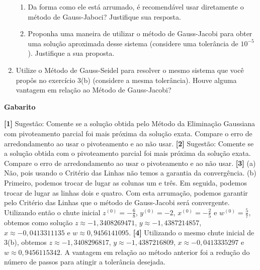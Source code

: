 \documentclass[12pt,a4paper]{article}
\begin{document}
\begin{enumerate}
  \begin{enumerate}
   \item Da forma como ele está arrumado, é recomendável usar diretamente o método de Gauss-Jaboci? Justifique sua resposta.
   \item Proponha uma maneira de utilizar o método de Gauss-Jacobi para obter uma solução aproximada desse sistema (considere uma tolerância de $10^{-5}$). 
         Justifique a sua proposta.
  \end{enumerate}


  \item Utilize o Método de Gauss-Seidel para resolver o mesmo sistema que você propôs no exercício 3(b) (considere a mesma tolerância). Houve alguma vantagem em relação ao 
Método de Gauss-Jacobi?

\end{enumerate}

\begin{center}
\textbf{Gabarito}
\end{center} 
\textbf{[1]} Sugestão: Comente se a solução obtida pelo Método da Eliminação Gaussiana com pivoteamento parcial foi mais próxima da solução exata. 
Compare o erro de arredondamento ao usar o pivoteamento e ao não usar.
\textbf{[2]} Sugestão: Comente se a solução obtida com o pivoteamento parcial foi mais próxima da solução exata. 
Compare o erro de arredondamento ao usar o pivoteamento e ao não usar. 
\textbf{[3]} (a) Não, pois usando o Critério das Linhas não temos a garantia da convergência. 
(b) Primeiro, podemos trocar de lugar as colunas um e três. Em seguida, podemos trocar de lugar as linhas dois e quatro. Com esta arrumação,
podemos garantir pelo Critério das Linhas que o método de Gauss-Jacobi será convergente. Utilizando então o chute inicial $z^{(0)} = -\frac{6}{8}$, 
$y^{(0)} = -2$, $x^{(0)} = -\frac{2}{5}$ e $w^{(0)} = \frac{5}{7}$, obtemos como solução $z \approx -1,3408269471$, $y \approx -1,4387214857$, 
$x\approx -0,0413311135$ e $w\approx 0,9456141095$. 
\textbf{[4]} Utilizando o mesmo chute inicial de 3(b), obtemos $z \approx -1,3408296817$, $y \approx -1,4387216809$, 
$x\approx -0,0413335297$ e $w\approx 0,9456115342$. A vantagem em relação ao método anterior foi a redução do número de passos para atingir a 
tolerância desejada.
\end{document}
